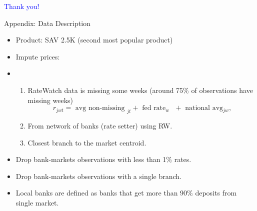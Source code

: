 \documentclass[notes,11pt, aspectratio=169]{beamer}
\begin{document}
\begin{frame}
\textcolor{blue}{\huge{\centerline{Thank you!}}}
\end{frame}

%    
%    


\appendix


 \begin{frame}[label=backg_data_appendix]{Appendix: Data Description \hyperlink{data}{}}
\begin{itemize}
  \item Product: SAV 2.5K (second most popular product)
  \item Impute prices:
  \item \begin{enumerate}
    \item RateWatch data is missing some weeks (around 75\% of observations have missing weeks)
    $$r_{jwt} = \text{ avg non-missing }_{jt} + \text{ fed rate$_w$ } + \text{ national avg$_{jw}$,} $$
    \item From network of banks (rate setter) using RW.
    \item Closest branch to the market centroid. 
  \end{enumerate}
  \item Drop bank-markets observations with less than 1\% rates.
  \item Drop bank-markets observations with a single branch.
  \item Local banks are defined as banks that get more than 90\% deposits from single market. 
\end{itemize}
 \end{frame}



\end{document}
